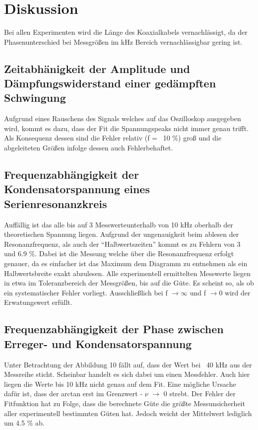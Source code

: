 \section{Diskussion}
\label{sec:Diskussion}
Bei allen Experimenten wird die Länge des Koaxialkabels vernachlässigt, da der Phasenunterschied bei Messgrößen im kHz Bereich vernachlässigbar gering ist.
\subsection{Zeitabhänigkeit der Amplitude und Dämpfungswiderstand einer gedämpften Schwingung}
Aufgrund eines Rauschens des Signals welches auf das Oszilloskop ausgegeben wird, kommt es dazu, dass der Fit die Spannungspeaks nicht immer genau trifft. Als Konsequenz dessen sind die Fehler relativ (f =  ~10 \%) groß und die abgeleiteten Größen infolge dessen auch Fehlerbehaftet.
\subsection{Frequenzabhängigkeit der Kondensatorspannung eines
Serienresonanzkreis}
Auffällig ist das alle bis auf 3 Messwerteunterhalb von 10 kHz oberhalb der theoretischen Spannung liegen. Aufgrund der ungenauigkeit beim ablesen der Resonanzfrequenz, als auch der ``Halbwertszeiten'' kommt es zu Fehlern von 3 und 6.9 \%. Dabei ist die Messung welche über die Resonanzfrequenz erfolgt genauer, da es einfacher ist das Maximum dem Diagramm zu entnehmen als ein Halbwertsbreite exakt abzulesen.
Alle experimentell ermittelten Messwerte liegen in etwa im Toleranzbereich der Messgrößen, bis auf die Güte. Es scheint so, als ob ein systematischer Fehler vorliegt. Ausschließlich bei f $\rightarrow \infty $ und f $\rightarrow 0$ wird der Erwatungswert erfüllt.
\subsection{Frequenzabhängigkeit der Phase zwischen Erreger- und
Kondensatorspannung}
Unter Betrachtung der Abbildung 10 fällt auf, dass der Wert bei ~40 kHz aus der Messreihe sticht. Scheinbar handelt es sich dabei um einen Messfehler. Auch hier liegen die Werte bis 10 kHz nicht genau auf dem Fit. Eine  mögliche Ursache dafür ist, dass der arctan erst im Grenzwert - $\nu$ $\rightarrow$ 0 strebt. Der Fehler der Fitfunktion hat zu Folge, dass die berechnete Güte die größte Messunsicherheit aller experimentell bestimmten Güten hat. Jedoch weicht der Mittelwert lediglich um 4.5 \% ab.
